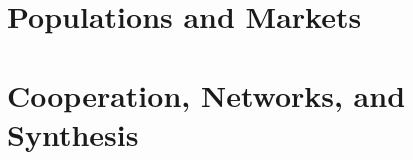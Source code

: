 \documentclass[11pt,twoside]{book}
\theoremstyle{plain}
\theoremstyle{definition}
\theoremstyle{remark}
\begin{document}
\part{Populations and Markets}
\label{part:populations}







\part{Cooperation, Networks, and Synthesis}
\label{part:synthesis}







\backmatter
\end{document}
